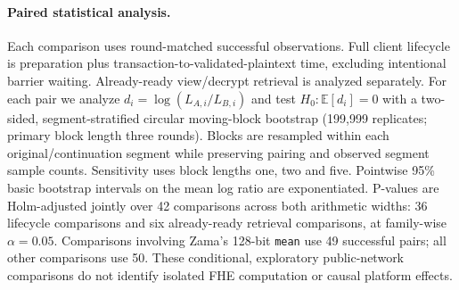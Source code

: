 \paragraph{Paired statistical analysis.}
Each comparison uses round-matched successful observations. Full client lifecycle is preparation plus transaction-to-validated-plaintext time, excluding intentional barrier waiting. Already-ready view/decrypt retrieval is analyzed separately.
For each pair we analyze $d_i=\log(L_{A,i}/L_{B,i})$ and test $H_0:\mathbb{E}[d_i]=0$ with a two-sided, segment-stratified circular moving-block bootstrap (199{,}999 replicates; primary block length three rounds).
Blocks are resampled within each original/continuation segment while preserving pairing and observed segment sample counts. Sensitivity uses block lengths one, two and five.
Pointwise 95\% basic bootstrap intervals on the mean log ratio are exponentiated. P-values are Holm-adjusted jointly over 42 comparisons across both arithmetic widths: 36 lifecycle comparisons and six already-ready retrieval comparisons, at family-wise $\alpha=0.05$.
Comparisons involving Zama's 128-bit \texttt{mean} use 49 successful pairs; all other comparisons use 50. These conditional, exploratory public-network comparisons do not identify isolated FHE computation or causal platform effects.
